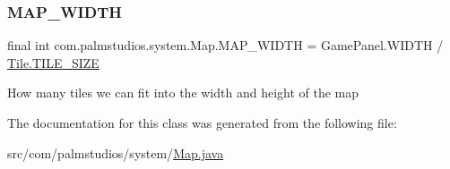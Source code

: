 \subsubsection{\texorpdfstring{M\+A\+P\+\_\+\+W\+I\+D\+TH}{MAP\_WIDTH}}
{\footnotesize\ttfamily final int com.\+palmstudios.\+system.\+Map.\+M\+A\+P\+\_\+\+W\+I\+D\+TH = Game\+Panel.\+W\+I\+D\+TH / \hyperlink{classcom_1_1palmstudios_1_1system_1_1_tile_aae4ab12b21c96fe4796978dc3ba6f8dc}{Tile.\+T\+I\+L\+E\+\_\+\+S\+I\+ZE}\hspace{0.3cm}{\ttfamily [static]}}

How many tiles we can fit into the width and height of the map 

The documentation for this class was generated from the following file\+:\begin{DoxyCompactItemize}
\item 
src/com/palmstudios/system/\hyperlink{_map_8java}{Map.\+java}\end{DoxyCompactItemize}
